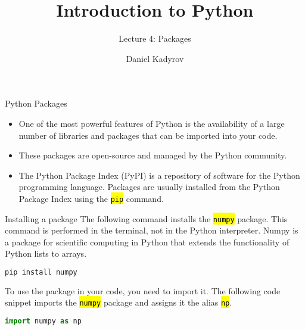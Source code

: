 \documentclass[
    aspectratio=169, 
    usepdftitle=false, 
    xcolor={dvipsnames},
    hyperref={
        colorlinks,
        linkcolor=black,
        urlcolor=blue}
    ]{beamer}
\title[Introduction to Python]{Introduction to Python}
\subtitle{Lecture 4: Packages}
\author{Daniel Kadyrov}
\date{}
\let\OldTexttt\texttt
\renewcommand{\texttt}[1]{\OldTexttt{\hl{#1}}}%
\begin{document}
\begin{frame}
    \titlepage
\end{frame}

\begin{frame}{Python Packages}
    \begin{itemize}
    \item One of the most powerful features of Python is the availability of a large number of libraries and packages that can be imported into your code.
    \item These packages are open-source and managed by the Python community.
    \item The Python Package Index (PyPI) is a repository of software for the Python programming language. Packages are usually installed from the Python Package Index using the \texttt{pip} command.
    \end{itemize}
\end{frame}

\begin{frame}[fragile]{Installing a package}
    The following command installs the \texttt{numpy} package. This command is performed in the terminal, not in the Python interpreter. Numpy is a package for scientific computing in Python that extends the functionality of Python lists to arrays.

    \begin{lstlisting}[language=bash]
pip install numpy
    \end{lstlisting}

    To use the package in your code, you need to import it. The following code snippet imports the \texttt{numpy} package and assigns it the alias \texttt{np}.

    \begin{lstlisting}[language=Python]
import numpy as np
    \end{lstlisting}
\end{frame}
\end{document}
